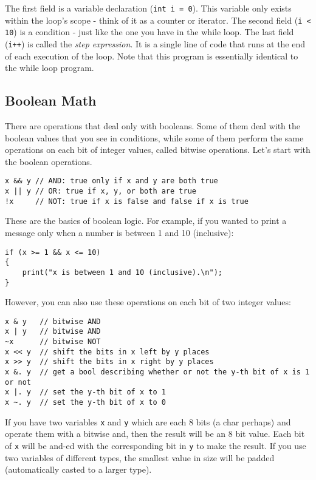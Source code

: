 \documentclass[10pt,a4paper]{article}
\begin{document}
The first field is a variable declaration (\verb|int i = 0|). This variable only exists within the loop's scope - think of it as a counter or iterator. The second field (\verb|i < 10|) is a condition - just like the one you have in the while loop. The last field (\verb|i++|) is called the \textit{step expression}. It is a single line of code that runs at the end of each execution of the loop. Note that this program is essentially identical to the while loop program.

\newpage



\subsection{Boolean Math}
There are operations that deal only with booleans. Some of them deal with the boolean values that you see in conditions, while some of them perform the same operations on each bit of integer values, called bitwise operations. Let's start with the boolean operations.
\begin{verbatim}
x && y // AND: true only if x and y are both true
x || y // OR: true if x, y, or both are true
!x     // NOT: true if x is false and false if x is true
\end{verbatim}

These are the basics of boolean logic. For example, if you wanted to print a message only when a number is between 1 and 10 (inclusive):
\begin{verbatim}
if (x >= 1 && x <= 10)
{
    print("x is between 1 and 10 (inclusive).\n");
}
\end{verbatim}

However, you can also use these operations on each bit of two integer values:
\begin{verbatim}
x & y   // bitwise AND
x | y   // bitwise AND
~x      // bitwise NOT
x << y  // shift the bits in x left by y places
x >> y  // shift the bits in x right by y places
x &. y  // get a bool describing whether or not the y-th bit of x is 1 or not
x |. y  // set the y-th bit of x to 1
x ~. y  // set the y-th bit of x to 0
\end{verbatim}

If you have two variables \verb|x| and \verb|y| which are each 8 bits (a char perhaps) and operate them with a bitwise and, then the result will be an 8 bit value. Each bit of \verb|x| will be and-ed with the corresponding bit in \verb|y| to make the result. If you use two variables of different types, the smallest value in size will be padded (automatically casted to a larger type).
\end{document}
